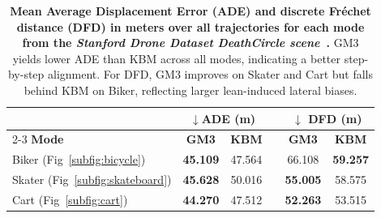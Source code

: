 \documentclass[letterpaper, 10 pt, conference]{ieeeconf}  %
\begin{document}
\begin{table}[t]
    \centering
    \vspace*{0.5em}
    \begin{tabular}{lccccc}
    \toprule
         & \multicolumn{2}{c}{$\downarrow$\textbf{ADE (m)}} & \phantom{a} &  \multicolumn{2}{c}{$\downarrow$ \textbf{DFD (m)}} \\
        \cmidrule{2-3} \cmidrule{5-6}
        \textbf{Mode} & \textbf{GM3} & \textbf{KBM} & \phantom{a} & \textbf{GM3} & \textbf{KBM} \\
        \midrule
        Biker (Fig~\ref{subfig:bicycle})  & \textbf{45.109} & 47.564 & \phantom{a} & 66.108 & \textbf{59.257} \\
        Skater (Fig~\ref{subfig:skateboard}) & \textbf{45.628} & 50.016 & \phantom{a} & \textbf{55.005} & 58.575 \\
        Cart (Fig~\ref{subfig:cart})  & \textbf{44.270} & 47.512 & \phantom{a} & \textbf{52.263} & 53.515 \\
        \bottomrule
    \end{tabular}
    \vspace*{-0.25em}
    \caption{\small \textbf{Mean Average Displacement Error (ADE) and discrete Fréchet distance (DFD) in meters over all trajectories for each mode from the {\em Stanford Drone Dataset DeathCircle scene}~\cite{robicquet2017learning}.} GM3 yields lower ADE than KBM across all modes, indicating a better step-by-step alignment. For DFD, GM3 improves on Skater and Cart but falls behind KBM on Biker, reflecting larger lean-induced lateral biases.}
    \label{tab:results}
    \vspace*{-1em}
\end{table}
\end{document}
